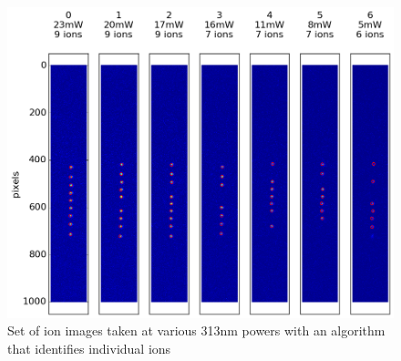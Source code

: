 \begin{figure}[H]
	\centering
	\includegraphics[width=\textwidth]{images/ion_images.png}
	\caption{Set of ion images taken at various 313nm powers with an algorithm that identifies individual ions}
	\label{fig: ion image set}
\end{figure}

